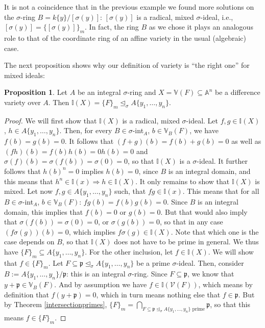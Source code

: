 \documentclass{article}
\def\I{\mathbb{I}}
\def\V{\mathcal{V}}
\def\VV{\mathbb{V}}
\def\p{\mathfrak{p}}
\def\s{\sigma}
\def\si{\unlhd_{\sigma}}
\newenvironment{bew}{\begin{proof}[Proof]}{\end{proof}}
\theoremstyle{definition}
\newtheorem{prop}[Satz]{Proposition}
\begin{document}
It is not a coincidence that in the previous example we found more solutions on the $\s$-ring $B = k\{y\}/[\s(y)]$: $[\s(y)]$ is a radical, mixed $\s$-ideal, i.e., $[\s(y)] = \{ [\s(y)] \}_m$.
In fact, the ring $B$ as we chose it plays an analogous role to that of the coordinate ring of an affine variety in the usual (algebraic) case.

The next proposition shows why our definition of variety is ``the right one'' for mixed ideals:

\begin{prop}\label{I=F_m}
Let $A$ be an integral $\s$-ring and $X = \VV(F) \subseteq \mathbb{A}^n$ be a difference variety over $A$. Then $\I(X) = \{F\}_m \si A\{y_1,\ldots,y_n\}$. 
\begin{bew}
We will first show that $\I(X)$ is a radical, mixed $\s$-ideal.
Let $f, g \in \I(X)$, $h \in A\{y_1,\ldots,y_n\}$. Then, for every $B \in \s$-int$_A$, $b \in \VV_B(F)$, we have $f(b) = g(b) = 0$.
It follows that $(f + g)(b) = f(b) + g(b) = 0$ as well as $(fh)(b) = f(b)h(b) = 0 h(b) = 0$ and $\s(f)(b) = \s(f(b)) = \s(0) = 0$, so that $\I(X)$ is a $\s$-ideal.
It further follows that $h(b)^n = 0$ implies $h(b) = 0$, since $B$ is an integral domain, and this means that $h^n \in \I(x) \Rightarrow h \in \I(X)$. It only remains to show that $\I(X)$ is mixed.
Let now $f,g \in A\{y_1,\ldots,y_n\}$ such, that $fg \in \I(x)$. This means that for all  $B \in \s$-int$_A$, $b \in \VV_B(F)$: $fg(b) = f(b) g(b) = 0$. Since $B$ is an integral domain,
this implies that $f(b) = 0$ or $g(b) = 0$. But that would also imply that $\s(f(b)) = \s(0) = 0$, or $\s(g(b)) = 0$, so that in any case $(f\s(g))(b) = 0$, which implies $f\s(g) \in \I(X)$.
Note that which one is the case depends on $B$, so that $\I(X)$ does not have to be prime in general. We thus have $\{F\}_m \subseteq A\{y_1,\ldots,y_n\}$. For the other inclusion, let $f \in \I(X)$. We will show that $f \in \{F\}_m$. Let $F \subseteq \p \si A\{y_1,\ldots,y_n\}$ be a prime $\s$-ideal.
Then, consider $B:= A\{y_1,\ldots,y_n\}/\p$: this is an integral $\s$-ring. Since $F \subseteq \p$, we know that $y + \p \in \VV_B(F)$. And by assumption we have $f \in \I(\V(F))$, which means by definition that $f(y + \p) = 0$, which
in turn means nothing else that $f \in \p$. But by Theorem \ref{intersectionprimes}, $\{F\}_m = \bigcap_{F \subseteq \p \si A\{y_1,\ldots,y_n\} \text{ prime}} \p$, so that this means $f \in \{F\}_m$.
\end{bew}
\end{prop}
\end{document}
